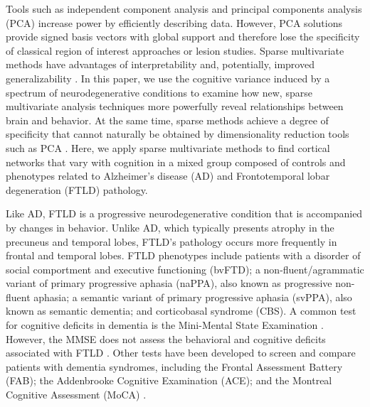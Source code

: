 \documentclass[preprint,authoryear,12pt]{elsarticle}
\begin{document}
Tools such as independent component analysis and principal components analysis (PCA) \citet{mansfield_analytic_1977,comon_independent_1994,yeung_principal_2001,Borroni2012,Shamy2011} increase power by efficiently describing data.  However, PCA solutions provide signed basis vectors with global support and therefore lose the specificity of classical region of interest approaches or lesion studies.  Sparse multivariate methods have advantages of interpretability \citet{lee_learning_1999,Suykens2002} and, potentially, improved generalizability \citet{elad_why_2006,Zhang2008,Yamashita2008,Ryali2010,zibulevsky_l1-l2_2010}.  In this paper, we use the cognitive variance induced by a spectrum of neurodegenerative conditions to examine how new, sparse multivariate analysis techniques more powerfully reveal relationships between brain and behavior.  At the same time, sparse methods achieve a degree of specificity that cannot naturally be obtained by dimensionality reduction tools such as PCA \citet{lee_learning_1999}.  Here, we apply sparse multivariate methods to find cortical networks that vary with cognition in a mixed group composed of controls and phenotypes related to Alzheimer's disease (AD) and Frontotemporal lobar degeneration (FTLD) pathology.

Like AD, FTLD is a progressive neurodegenerative condition that is accompanied by changes in behavior.  Unlike AD, which typically presents atrophy in the precuneus and temporal lobes, FTLD's pathology occurs more frequently in frontal and temporal lobes\citet{Rabinovici2007,Whitwell2007d}.  FTLD phenotypes include patients with a disorder of social comportment and executive functioning (bvFTD); a non-fluent/agrammatic variant of primary progressive aphasia (naPPA), also known as progressive non-fluent aphasia; a semantic variant of primary progressive aphasia (svPPA), also known as semantic dementia; and corticobasal syndrome (CBS).  A common test for cognitive deficits in dementia is the Mini-Mental State Examination \citet{Hill1995}. However, the MMSE does not assess the behavioral and cognitive deficits associated with FTLD \citet{Hutchinson2007}.  Other tests have been developed to screen and compare patients with dementia syndromes, including the Frontal Assessment Battery \citet{Dubois2000} (FAB); the Addenbrooke Cognitive Examination \citet{Galton2005} (ACE); and the Montreal Cognitive Assessment (MoCA) \citet{Nasreddine2005}.
\end{document}
